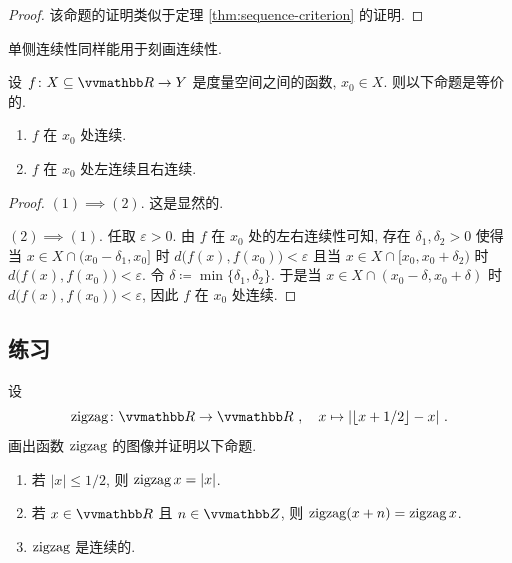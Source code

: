 \begin{proof}
    该命题的证明类似于定理 \ref{thm:sequence-criterion} 的证明.
\end{proof}

单侧连续性同样能用于刻画连续性.

\begin{proposition}
    设 \(f \colon X \subseteq \R \to Y\) 是度量空间之间的函数, \(x_0 \in X\). 则以下命题是等价的.
    \begin{enumerate}
        \item \(f\) 在 \(x_0\) 处连续.
        \item \(f\) 在 \(x_0\) 处左连续且右连续.
    \end{enumerate}
\end{proposition}

\begin{proof}
    \((1) \implies (2)\). 这是显然的.

    \((2) \implies (1)\). 任取 \(\varepsilon > 0\). 由 \(f\) 在 \(x_0\) 处的左右连续性可知, 存在 \(\delta_1, \delta_2 > 0\) 使得当 \(x \in X \cap (x_0 - \delta_1, x_0]\) 时 \(d\bigl(f(x), f(x_0)\bigr) < \varepsilon\) 且当 \(x \in X \cap [x_0, x_0 + \delta_2)\) 时 \(d\bigl(f(x), f(x_0)\bigr) < \varepsilon\). 令 \(\delta \coloneqq \min\{\delta_1, \delta_2\}\). 于是当 \(x \in X \cap (x_0 - \delta, x_0 + \delta)\) 时 \(d\bigl(f(x), f(x_0)\bigr) < \varepsilon\), 因此 \(f\) 在 \(x_0\) 处连续.
\end{proof}

\subsection{练习}

\begin{exercise}\label{ex:zigzag}
    设
    \[
        \zigzag \colon \R \to \R\ ,\quad x \mapsto |\lfloor x + 1 / 2 \rfloor - x|\ .
    \]
    画出函数 \(\operatorname{zigzag}\) 的图像并证明以下命题.
    \begin{enumerate}
        \item 若 \(|x| \leq 1 / 2\), 则 \(\operatorname{zigzag} x = |x|\).
        \item 若 \(x \in \R\) 且 \(n \in \Z\), 则 \(\operatorname{zigzag}(x + n) = \operatorname{zigzag} x\).
        \item \(\operatorname{zigzag}\) 是连续的.
    \end{enumerate}
\end{exercise}

